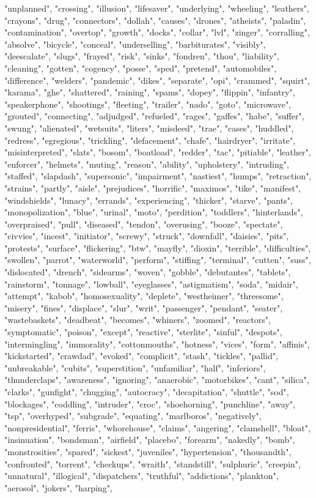 "unplanned", "crossing", "illusion", "lifesaver", "underlying", "wheeling", "leathers", "crayons", "drug", "connectors", "dollah", "causes", "drones", "atheists", "paladin", "contamination", "overtop", "growth", "docks", "collar", "lvl", "zinger", "corralling", "absolve", "bicycle", "conceal", "underselling", "barbiturates", "visibly", "deescalate", "slugs", "frayed", "risk", "sinks", "fondren", "thou", "liability", "cleaning", "gotten", "cogency", "posse", "sped", "pretend", "automobiles", "difference", "welders", "pandemic", "dikes", "separate", "opi", "crammed", "squirt", "karama", "ghe", "shattered", "raining", "spams", "dopey", "flippin", "infantry", "speakerphone", "shootings", "fleeting", "trailer", "nado", "goto", "microwave", "grouted", "connecting", "adjudged", "refueled", "rages", "gaffes", "habe", "suffer", "swung", "alienated", "wetsuits", "liters", "misdeed", "trae", "cases", "huddled", "redress", "egregious", "trickling", "defacement", "chafe", "hairdryer", "irritate", "misinterpreted", "slats", "bosom", "boatload", "redder", "tac", "pitiable", "leather", "enforcer", "helmets", "muting", "reason", "ability", "upholstery", "intruding", "staffed", "slapdash", "supersonic", "impairment", "nastiest", "humps", "retraction", "strains", "partly", "aisle", "prejudices", "horrific", "maximos", "tike", "manifest", "windshields", "lunacy", "errands", "experiencing", "thicker", "starve", "pants", "monopolization", "blue", "urinal", "moto", "perdition", "toddlers", "hinterlands", "overpraised", "pull", "diseased", "tendon", "overusing", "booze", "spectate", "civvies", "incest", "initiator", "screwy", "struck", "downfall", "daisies", "pits", "protests", "surface", "flickering", "btw", "mayfly", "dioxin", "terrible", "difficulties", "swollen", "parrot", "waterworld", "perform", "stiffing", "terminal", "cutten", "suss", "dislocated", "drench", "sidearms", "woven", "gobble", "debutantes", "tablets", "rainstorm", "tonnage", "lowball", "eyeglasses", "astigmatism", "soda", "midair", "attempt", "kabob", "homosexuality", "deplete", "westheimer", "threesome", "misery", "fines", "displace", "slur", "writ", "passenger", "pendant", "seater", "wastebaskets", "deadbeat", "becomes", "whiners", "zoomed", "reactors", "symptomatic", "poison", "except", "reactive", "sterlite", "sinful", "despots", "intermingling", "immorality", "cottonmouths", "hotness", "vices", "form", "affinis", "kickstarted", "crawdad", "evoked", "complicit", "stash", "tickles", "pallid", "unbreakable", "cubits", "superstition", "unfamiliar", "half", "inferiors", "thunderclaps", "awareness", "ignoring", "anaerobic", "motorbikes", "cant", "silica", "clarks", "gunfight", "chugging", "autocracy", "decapitation", "shuttle", "sod", "blockages", "coddling", "intruder", "croc", "shoehorning", "punchline", "away", "tsp", "overhyped", "subgrade", "equating", "marlboros", "negatively", "nonpresidential", "ferris", "whorehouse", "claims", "angering", "clamshell", "bloat", "insinuation", "bondsman", "airfield", "placebo", "forearm", "nakedly", "bomb", "monstrosities", "spared", "sickest", "juveniles", "hypertension", "thousandth", "confronted", "torrent", "checkups", "wraith", "standstill", "sulphuric", "creepin", "unnatural", "illogical", "dispatchers", "truthful", "addictions", "plankton", "aerosol", "jokers", "harping", 